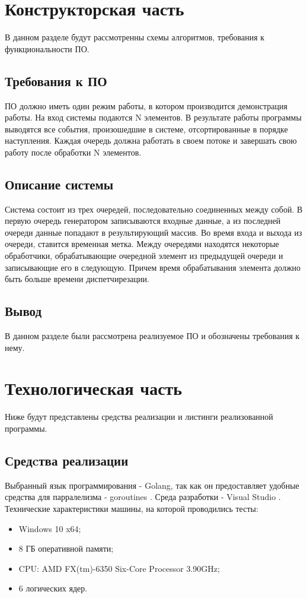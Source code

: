 \documentclass{article}
\begin{document}
	\section{Конструкторская часть}
		В данном разделе будут рассмотренны схемы алгоритмов, требования к функциональности ПО.
		\subsection{Требования к ПО} 
		ПО должно иметь один режим работы, в котором производится демонстрация работы. На вход системы подаются N элементов. В результате работы программы выводятся все события, произошедшие в системе, отсортированные в порядке наступления. Каждая очередь должна работать в своем потоке и завершать свою работу после обработки N элементов.	 	
		\subsection{Описание системы}
		Система состоит из трех очередей, последовательно соединенных между собой. В первую очередь генератором записываются входные данные, а из последней очереди данные попадают в результирующий массив. Во время входа и выхода из очереди, ставится временная метка.
		\newline
		\indent Между очередями находятся некоторые обработчики, обрабатывающие очередной элемент из предыдущей очереди и записывающие его в следующую. Причем время обрабатывания элемента должно быть больше времени диспетчирезации.
	\subsection{Вывод}
	В данном разделе были рассмотрена реализуемое ПО и обозначены требования к нему.
	
	\newpage
	\section{Технологическая часть}
	Ниже будут представлены средства реализации и листинги реализованной программы.
	\subsection{Средcтва реализации}
	Выбранный язык программирования - Golang, так как он предоставляет удобные средства для парралелизма -  goroutines \cite{go}. Среда разработки - Visual Studio \cite{vs}.
\newline
	\indent Технические характеристики машины, на которой проводились тесты:
	\begin{itemize}
	\item Windows 10 x64;
	\item 8 ГБ оперативной памяти;
	\item CPU: AMD FX(tm)-6350 Six-Core Processor 3.90GHz;
	\item 6 логических ядер.
	\end{itemize}	
\end{document}
